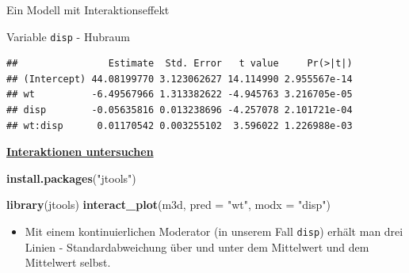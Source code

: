 \documentclass[ignorenonframetext,]{beamer}
\newenvironment{Shaded}{\begin{snugshade}}{\end{snugshade}}
\newcommand{\DataTypeTok}[1]{\textcolor[rgb]{0.13,0.29,0.53}{#1}}
\newcommand{\KeywordTok}[1]{\textcolor[rgb]{0.13,0.29,0.53}{\textbf{#1}}}
\newcommand{\NormalTok}[1]{#1}
\newcommand{\OperatorTok}[1]{\textcolor[rgb]{0.81,0.36,0.00}{\textbf{#1}}}
\newcommand{\StringTok}[1]{\textcolor[rgb]{0.31,0.60,0.02}{#1}}
\providecommand{\tightlist}{%
  \setlength{\itemsep}{0pt}\setlength{\parskip}{0pt}}
\begin{document}
\begin{frame}[fragile]{Ein Modell mit Interaktionseffekt}
\protect\hypertarget{ein-modell-mit-interaktionseffekt}{}

\begin{block}{Variable \texttt{disp} - Hubraum}

\begin{Shaded}
\end{Shaded}

\begin{verbatim}
##                Estimate  Std. Error   t value     Pr(>|t|)
## (Intercept) 44.08199770 3.123062627 14.114990 2.955567e-14
## wt          -6.49567966 1.313382622 -4.945763 3.216705e-05
## disp        -0.05635816 0.013238696 -4.257078 2.101721e-04
## wt:disp      0.01170542 0.003255102  3.596022 1.226988e-03
\end{verbatim}

\end{block}

\end{frame}

\begin{frame}[fragile]{\href{https://cran.r-project.org/web/packages/jtools/vignettes/interactions.html}{\textbf{Interaktionen
untersuchen}}}
\protect\hypertarget{interaktionen-untersuchen}{}

\begin{Shaded}
\begin{Highlighting}[]
\KeywordTok{install.packages}\NormalTok{(}\StringTok{"jtools"}\NormalTok{)}
\end{Highlighting}
\end{Shaded}

\begin{Shaded}
\begin{Highlighting}[]
\KeywordTok{library}\NormalTok{(jtools)}
\KeywordTok{interact_plot}\NormalTok{(m3d, }\DataTypeTok{pred =} \StringTok{"wt"}\NormalTok{, }\DataTypeTok{modx =} \StringTok{"disp"}\NormalTok{)}
\end{Highlighting}
\end{Shaded}

\begin{itemize}
\tightlist
\item
  Mit einem kontinuierlichen Moderator (in unserem Fall \texttt{disp})
  erhält man drei Linien - Standardabweichung über und unter dem
  Mittelwert und dem Mittelwert selbst.
\end{itemize}

\end{frame}
\end{document}
